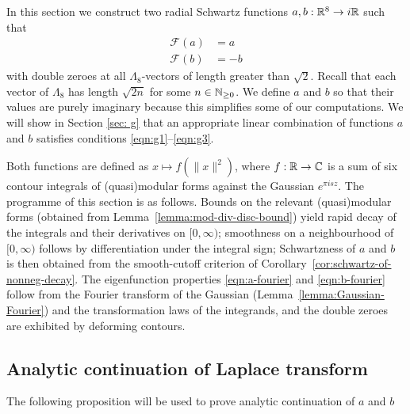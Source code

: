 In this section we construct two radial Schwartz functions $a,b:\mathbb{R}^8\to i\mathbb{R}$ such that
\begin{align}\mathcal{F}(a)&=a\label{eqn:a-fourier}\\
    \mathcal{F}(b)&=-b\label{eqn:b-fourier}
\end{align}
with double zeroes at all $\Lambda_8$-vectors of length greater than $\sqrt{2}$. Recall that each vector of $\Lambda_8$ has length $\sqrt{2n}$ for some $n\in\mathbb{N}_{\geq 0}$.
We define $a$ and $b$ so that their values are purely imaginary because this simplifies some of our computations.
We will show in Section \ref{sec: g} that an appropriate linear combination of functions $a$ and $b$ satisfies conditions \eqref{eqn:g1}--\eqref{eqn:g3}.

Both functions are defined as $x \mapsto f(\|x\|^2)$, where $f : \mathbb{R} \to \mathbb{C}$ is a sum of six contour integrals of (quasi)modular forms against the Gaussian $e^{\pi i s z}$. The programme of this section is as follows. Bounds on the relevant (quasi)modular forms (obtained from Lemma~\ref{lemma:mod-div-disc-bound}) yield rapid decay of the integrals and their derivatives on $[0, \infty)$; smoothness on a neighbourhood of $[0,\infty)$ follows by differentiation under the integral sign; Schwartzness of $a$ and $b$ is then obtained from the smooth-cutoff criterion of Corollary~\ref{cor:schwartz-of-nonneg-decay}. The eigenfunction properties \eqref{eqn:a-fourier} and \eqref{eqn:b-fourier} follow from the Fourier transform of the Gaussian (Lemma~\ref{lemma:Gaussian-Fourier}) and the transformation laws of the integrands, and the double zeroes are exhibited by deforming contours.

\subsection{Analytic continuation of Laplace transform}

The following proposition will be used to prove analytic continuation of $a$ and $b$

